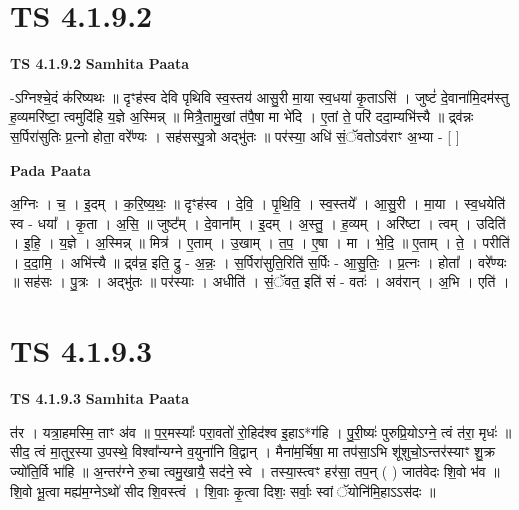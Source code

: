 \documentclass[17pt]{extarticle}
\begin{document}
\section*{ TS 4.1.9.2 }

\textbf{TS 4.1.9.2 } \newline
\textbf{Samhita Paata} \newline

-ऽग्निश्चे॒दं क॑रिष्यथः ॥ दृꣳह॑स्व देवि पृथिवि स्व॒स्तय॑ आसु॒री मा॒या स्व॒धया॑ कृ॒ताऽसि॑ । जुष्टं॑ दे॒वाना॑मि॒दम॑स्तु ह॒व्यमरि॑ष्टा॒ त्वमुदि॑हि य॒ज्ञे अ॒स्मिन्न् ॥ मित्रै॒तामु॒खां त॑पै॒षा मा भे॑दि । ए॒तां ते॒ परि॑ ददा॒म्यभि॑त्त्यै ॥ द्र्व॑न्नः स॒र्पिरा॑सुतिः प्र॒त्नो होता॒ वरे᳚ण्यः । सह॑सस्पु॒त्रो अद्भु॑तः ॥ पर॑स्या॒ अधि॑ सं॒ॅवतोऽव॑राꣳ अ॒भ्या - [  ] \newline

\textbf{Pada Paata} \newline

अ॒ग्निः । च॒ । इ॒दम् । क॒रि॒ष्य॒थः॒ ॥ दृꣳह॑स्व । दे॒वि॒ । पृ॒थि॒वि॒ । स्व॒स्तये᳚ । आ॒सु॒री । मा॒या । स्व॒धयेति॑ स्व - धया᳚ । कृ॒ता । अ॒सि॒ ॥ जुष्ट᳚म् । दे॒वाना᳚म् । इ॒दम् । अ॒स्तु॒ । ह॒व्यम् । अरि॑ष्टा । त्वम् । उदिति॑ । इ॒हि॒ । य॒ज्ञे । अ॒स्मिन्न् ॥ मित्र॑ । ए॒ताम् । उ॒खाम् । त॒प॒ । ए॒षा । मा । भे॒दि॒ ॥ ए॒ताम् । ते॒ । परीति॑ । द॒दा॒मि॒ । अभि॑त्त्यै ॥ द्र्‌व॑न्न॒ इति॒ द्रु - अ॒न्नः॒ । स॒र्पिरा॑सुति॒रिति॑ स॒र्पिः - आ॒सु॒तिः॒ । प्र॒त्नः । होता᳚ । वरे᳚ण्यः ॥ सह॑सः । पु॒त्रः । अद्भु॑तः ॥ पर॑स्याः । अधीति॑ । सं॒ॅवत॒ इति॑ सं - वतः॑ । अव॑रान् । अ॒भि । एति॑ ।  \newline




\section*{ TS 4.1.9.3 }

\textbf{TS 4.1.9.3 } \newline
\textbf{Samhita Paata} \newline

त॑र । यत्रा॒हमस्मि॒ ताꣳ अ॑व ॥ प॒र॒मस्याः᳚ परा॒वतो॑ रो॒हिद॑श्व इ॒हाऽ*ग॑हि । पु॒री॒ष्यः॑ पुरुप्रि॒योऽग्ने॒ त्वं त॑रा॒ मृधः॑ ॥ सीद॒ त्वं मा॒तुर॒स्या उ॒पस्थे॒ विश्वा᳚न्यग्ने व॒युना॑नि वि॒द्वान् । मैना॑म॒र्चिषा॒ मा तप॑सा॒ऽभि शू॑शुचो॒ऽन्तर॑स्याꣳ शु॒क्र ज्यो॑ति॒र्वि भा॑हि ॥ अ॒न्तर॑ग्ने रु॒चा त्वमु॒खायै॒ सद॑ने॒ स्वे । तस्या॒स्त्वꣳ हर॑सा॒ तप॒न् ( ) जात॑वेदः शि॒वो भ॑व ॥ शि॒वो भू॒त्वा मह्य॑म॒ग्नेऽथो॑ सीद शि॒वस्त्वं । शि॒वाः कृ॒त्वा दिशः॒ सर्वाः॒ स्वां ॅयोनि॑मि॒हाऽऽस॑दः ॥ \newline
\end{document}
